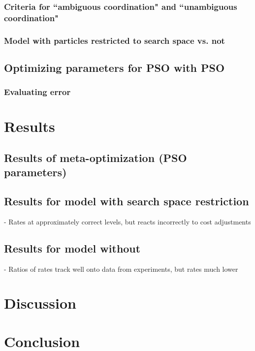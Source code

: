 \documentclass[12pt]{article}
\begin{document}
\subsubsection{Criteria for ``ambiguous coordination" and ``unambiguous coordination"}
\subsubsection{Model with particles restricted to search space vs. not}

\subsection{Optimizing parameters for PSO with PSO}
\subsubsection{Evaluating error}

\section{Results}
\subsection{Results of meta-optimization (PSO parameters)}
\subsection{Results for model with search space restriction}
- Rates at approximately correct levels, but reacts incorrectly to cost adjustments
\subsection{Results for model without}
- Ratios of rates track well onto data from experiments, but rates much lower


\section{Discussion}



\section{Conclusion}





\end{document}
